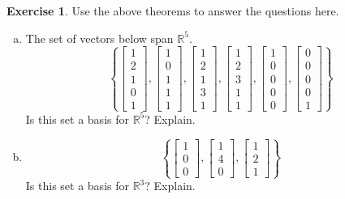 \documentclass[10pt]{book}
\theoremstyle{definition}
\newtheorem{exercise}{Exercise}[section]
\newcommand{\R}{\mathbb{R}}
\begin{document}
\begin{exercise} %
	Use the above theorems to answer the questions here.
	\begin{multicols}{2}
		\begin{enumerate}[(a)]
			\item The set of vectors below span $\R^5$.
			$$\left\{
			\begin{bmatrix}1\\2\\1\\0\\1\end{bmatrix},
			\begin{bmatrix}1\\0\\1\\1\\1\end{bmatrix},
			\begin{bmatrix}1\\2\\1\\3\\1\end{bmatrix},
			\begin{bmatrix}1\\2\\3\\1\\1\end{bmatrix},
			\begin{bmatrix}1\\0\\0\\0\\0\end{bmatrix},
			\begin{bmatrix}0\\0\\0\\0\\1\end{bmatrix}
			\right\}$$
			Is this set a basis for $\R^5$? Explain.
			
			\columnbreak
			\item 
			$$\left\{
			\begin{bmatrix}1\\0\\0\end{bmatrix},
			\begin{bmatrix}1\\4\\0\end{bmatrix},
			\begin{bmatrix}1\\2\\1\end{bmatrix}
			\right\}$$
			Is this set a basis for $\R^3$? Explain.
		\end{enumerate}
	\end{multicols}
\end{exercise}
\vfill
\end{document}
